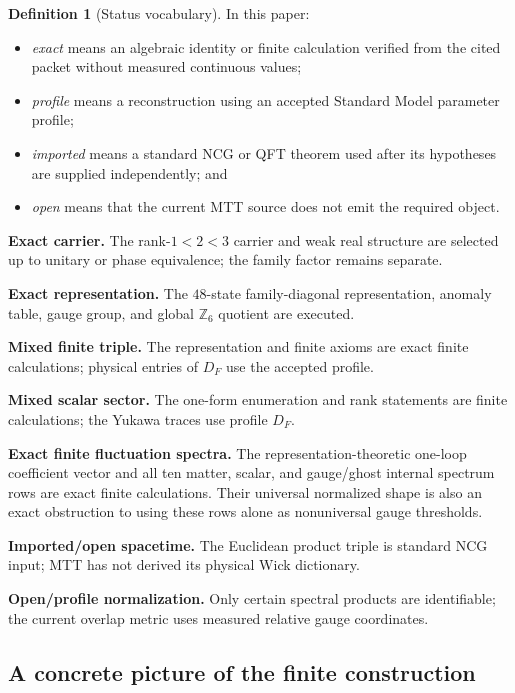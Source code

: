 \documentclass[11pt,a4paper,twoside]{article}
\theoremstyle{plain}
\theoremstyle{definition}
\newtheorem{definition}[theorem]{Definition}
\theoremstyle{remark}
\newcommand{\DF}{D_{F}}
\begin{document}
\begin{definition}[Status vocabulary]
In this paper:
\begin{itemize}
\item \emph{exact} means an algebraic identity or finite calculation verified
      from the cited packet without measured continuous values;
\item \emph{profile} means a reconstruction using an accepted Standard Model
      parameter profile;
\item \emph{imported} means a standard NCG or QFT theorem used after its
      hypotheses are supplied independently; and
\item \emph{open} means that the current MTT source does not emit the required
      object.
\end{itemize}
\end{definition}

\noindent\textbf{Exact carrier.}
The rank-$1<2<3$ carrier and weak real structure are
selected up to unitary or phase equivalence; the family factor remains
separate.

\noindent\textbf{Exact representation.}
The $48$-state family-diagonal representation,
anomaly table, gauge group, and global $\mathbb{Z}_6$ quotient are executed.

\noindent\textbf{Mixed finite triple.}
The representation and finite axioms are exact
finite calculations; physical entries of $\DF$ use the accepted profile.

\noindent\textbf{Mixed scalar sector.}
The one-form enumeration and rank statements are
finite calculations; the Yukawa traces use profile $\DF$.

\noindent\textbf{Exact finite fluctuation spectra.}
The representation-theoretic one-loop coefficient vector and all ten
matter, scalar, and gauge/ghost internal spectrum rows are exact finite
calculations.  Their universal normalized shape is also an exact obstruction
to using these rows alone as nonuniversal gauge thresholds.

\noindent\textbf{Imported/open spacetime.}
The Euclidean product triple is standard NCG
input; MTT has not derived its physical Wick dictionary.

\noindent\textbf{Open/profile normalization.}
Only certain spectral products are
identifiable; the current overlap metric uses measured relative gauge
coordinates.

\subsection*{A concrete picture of the finite construction}
\end{document}
